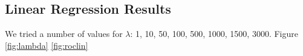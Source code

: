 \documentclass[preprint]{acm_proc_article-sp}
\begin{document}
%
%
%

\subsection{Linear Regression Results}

We tried a number of values for $\lambda$: 1, 10, 50, 100, 500, 1000, 1500, 3000. Figure \ref{fig:lambda}
\ref{fig:roclin}
\end{document}
